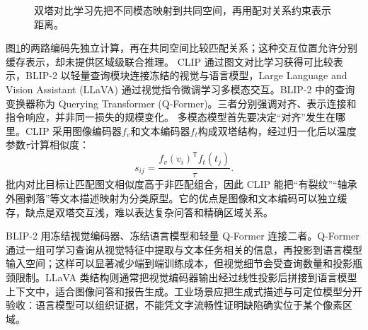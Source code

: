 \begin{figure}[htbp]
\centering
{}
\caption{双塔对比学习先把不同模态映射到共同空间，再用配对关系约束表示距离。}
\label{fig:multimodal-dual-encoder}
\end{figure}
图\ref{fig:multimodal-dual-encoder}的两路编码先独立计算，再在共同空间比较匹配关系；这种交互位置允许分别缓存表示，却未提供区域级联合推理。
CLIP 通过图文对比学习获得可比较表示，BLIP-2 以轻量查询模块连接冻结的视觉与语言模型，Large Language and Vision Assistant (LLaVA) 通过视觉指令微调学习多模态交互\cite{radford2021clip,li2023blip2,liu2023llava}。BLIP-2 中的查询变换器称为 Querying Transformer (Q-Former)。三者分别强调对齐、表示连接和指令响应，并非同一损失的规模变化。
多模态模型首先要决定“对齐”发生在哪里。CLIP 采用图像编码器$f_v$和文本编码器$f_t$构成双塔结构，经过归一化后以温度参数$\tau$计算相似度：
\begin{equation}
 s_{ij}=\frac{f_v(v_i)^{\mathsf T}f_t(t_j)}{\tau}.
\end{equation}
批内对比目标让匹配图文相似度高于非匹配组合，因此 CLIP 能把“有裂纹”“轴承外圈剥落”等文本描述映射为分类原型。它的优点是图像和文本编码可以独立缓存，缺点是双塔交互浅，难以表达复杂问答和精确区域关系。

BLIP-2 用冻结视觉编码器、冻结语言模型和轻量 Q-Former 连接二者。Q-Former 通过一组可学习查询从视觉特征中提取与文本任务相关的信息，再投影到语言模型输入空间；这样可以显著减少端到端训练成本，但视觉细节会受查询数量和投影瓶颈限制。LLaVA 类结构则通常把视觉编码器输出经过线性投影后拼接到语言模型上下文中，适合图像问答和报告生成。工业场景应把生成式描述与可定位模型分开验收：语言模型可以组织证据，不能凭文字流畅性证明缺陷确实位于某个像素区域。

